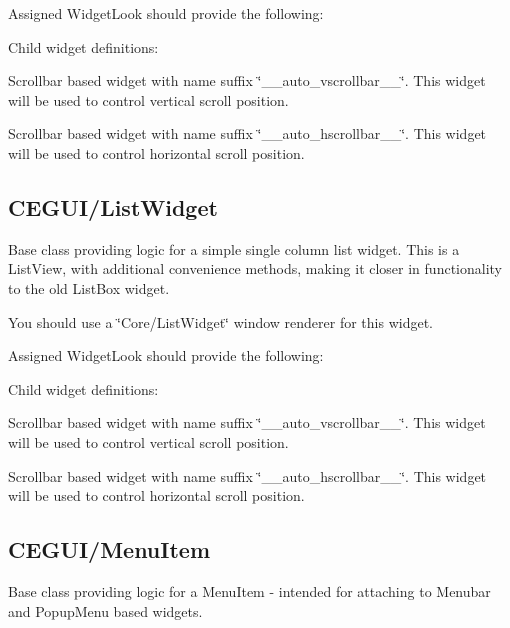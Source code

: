 Assigned Widget\+Look should provide the following\+: 
\begin{DoxyItemize}
\item Child widget definitions\+: 
\begin{DoxyItemize}
\item Scrollbar based widget with name suffix \char`\"{}\+\_\+\+\_\+auto\+\_\+vscrollbar\+\_\+\+\_\+\char`\"{}. This widget will be used to control vertical scroll position. 
\item Scrollbar based widget with name suffix \char`\"{}\+\_\+\+\_\+auto\+\_\+hscrollbar\+\_\+\+\_\+\char`\"{}. This widget will be used to control horizontal scroll position. 
\end{DoxyItemize}
\end{DoxyItemize}\hypertarget{fal_baseclass_ref_fal_baseclass_ref_sec_12}{}\subsection{C\+E\+G\+U\+I/\+List\+Widget}\label{fal_baseclass_ref_fal_baseclass_ref_sec_12}
Base class providing logic for a simple single column list widget. This is a List\+View, with additional convenience methods, making it closer in functionality to the old List\+Box widget.

You should use a \char`\"{}\+Core/\+List\+Widget\char`\"{} window renderer for this widget.

Assigned Widget\+Look should provide the following\+: 
\begin{DoxyItemize}
\item Child widget definitions\+: 
\begin{DoxyItemize}
\item Scrollbar based widget with name suffix \char`\"{}\+\_\+\+\_\+auto\+\_\+vscrollbar\+\_\+\+\_\+\char`\"{}. This widget will be used to control vertical scroll position. 
\item Scrollbar based widget with name suffix \char`\"{}\+\_\+\+\_\+auto\+\_\+hscrollbar\+\_\+\+\_\+\char`\"{}. This widget will be used to control horizontal scroll position. 
\end{DoxyItemize}
\end{DoxyItemize}\hypertarget{fal_baseclass_ref_fal_baseclass_ref_sec_13}{}\subsection{C\+E\+G\+U\+I/\+Menu\+Item}\label{fal_baseclass_ref_fal_baseclass_ref_sec_13}
Base class providing logic for a Menu\+Item -\/ intended for attaching to Menubar and Popup\+Menu based widgets.

